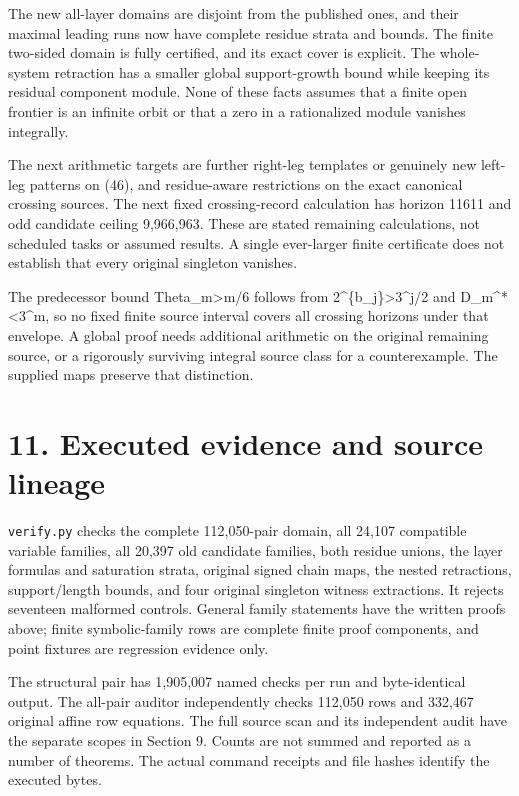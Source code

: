 The new all-layer domains are disjoint from the published ones, and
their maximal leading runs now have complete residue strata and bounds.
The finite two-sided domain is fully certified, and its exact cover is
explicit. The whole-system retraction has a smaller global
support-growth bound while keeping its residual component module. None
of these facts assumes that a finite open frontier is an infinite orbit
or that a zero in a rationalized module vanishes integrally.

The next arithmetic targets are further right-leg templates or genuinely
new left-leg patterns on (46), and residue-aware restrictions on the
exact canonical crossing sources. The next fixed crossing-record
calculation has horizon 11611 and odd candidate ceiling 9,966,963. These
are stated remaining calculations, not scheduled tasks or assumed
results. A single ever-larger finite certificate does not establish that
every original singleton vanishes.

The predecessor bound Theta\_m\textgreater m/6 follows from
2\^{}\{b\_j\}\textgreater3\^{}j/2 and D\_m\^{}*\textless3\^{}m, so no
fixed finite source interval covers all crossing horizons under that
envelope. A global proof needs additional arithmetic on the original
remaining source, or a rigorously surviving integral source class for a
counterexample. The supplied maps preserve that distinction.

\section{11. Executed evidence and source lineage}

\nolinkurl{verify.py} checks the complete 112,050-pair domain, all
24,107 compatible variable families, all 20,397 old candidate families,
both residue unions, the layer formulas and saturation strata, original
signed chain maps, the nested retractions, support/length bounds, and
four original singleton witness extractions. It rejects seventeen
malformed controls. General family statements have the written proofs
above; finite symbolic-family rows are complete finite proof components,
and point fixtures are regression evidence only.

The structural pair has 1,905,007 named checks per run and
byte-identical output. The all-pair auditor independently checks 112,050
rows and 332,467 original affine row equations. The full source scan and
its independent audit have the separate scopes in Section 9. Counts are
not summed and reported as a number of theorems. The actual command
receipts and file hashes identify the executed bytes.


